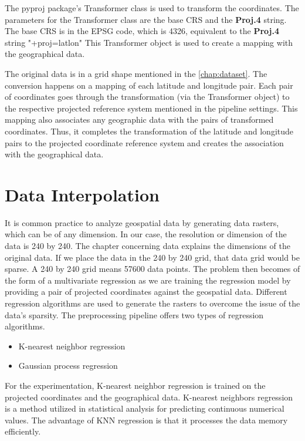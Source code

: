The pyproj package's Transformer class is used to transform the coordinates.
The parameters for the Transformer class are the base CRS and the \textbf{Proj.4} string. The base CRS is in the EPSG code, which is 4326, equivalent to the \textbf{Proj.4} string "+proj=latlon" This Transformer object is used to create a mapping with the geographical data.

The original data is in a grid shape mentioned in the \autoref{chap:dataset}. The conversion happens on a mapping of each latitude and longitude pair. Each pair of coordinates goes through the transformation (via the Transformer object) to the respective projected reference system mentioned in the pipeline settings.
This mapping also associates any geographic data with the pairs of transformed coordinates.
Thus, it completes the transformation of the latitude and longitude pairs to the projected coordinate reference system and creates the association with the geographical data.



\section{Data Interpolation }
It is common practice to analyze geospatial data by generating data rasters, which can be of any dimension. In our case, the resolution or dimension of the data is 240 by 240. The chapter concerning data explains the dimensions of the original data. If we place the data in the 240 by 240 grid, that data grid would be sparse. A 240 by 240 grid means 57600 data points. The problem then becomes of the form of a multivariate regression as we are training the regression model by providing a pair of projected coordinates against the geospatial data. Different regression algorithms are used to generate the rasters to overcome the issue of the data's sparsity. The preprocessing pipeline offers two types of regression algorithms.

\begin{itemize}
    \item K-nearest neighbor regression
    \item Gaussian process regression
\end{itemize}
For the experimentation, K-nearest neighbor regression is trained on the projected coordinates and the geographical data. K-nearest neighbors regression is a method utilized in statistical analysis for predicting continuous numerical values. The advantage of KNN regression is that it processes the data memory efficiently.

